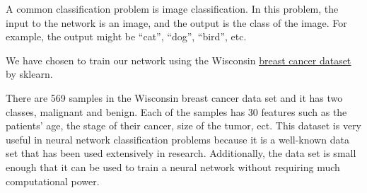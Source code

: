 A common classification problem is image classification. In
this problem, the input to the network is an image, and the output is the class
of the image. For example, the output might be “cat”, “dog”, “bird”, etc.

We have chosen to train our network using the Wisconsin 
\href{https://scikit-learn.org/stable/modules/generated/sklearn.datasets.load\_breast\_cancer.html?fbclid=IwAR0RNzOImikVXi41ecb14u\_qvUDybyIII43e9ySk0GEjyYWyPzybmmHeQWs}{\underline{breast
cancer dataset}} by sklearn.

There are 569 samples in the Wisconsin breast cancer data set and it has two
classes, malignant and benign. Each of the samples has 30 features such as the
patients’ age, the stage of their cancer, size of the tumor, ect. This dataset
is very useful in neural network classification problems because it is a well-known
data set that has been used extensively in research. Additionally, the data set
is small enough that it can be used to train a neural network without requiring
much computational power.
